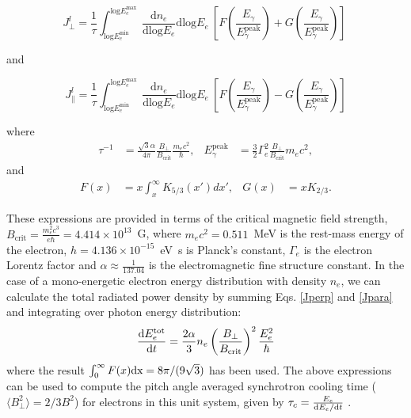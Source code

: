 \documentclass[usenatbib]{mnras}
\begin{document}
\begin{equation}
 {J_{\perp}^l} = \frac{1}{\tau}  \int_{\mathrm{log}E_e^{\mathrm{min}}}^{\mathrm{log}E_e^{\mathrm{max}}} \  \frac{\mathrm{d}n_e}{\mathrm{dlog}E_{e}} \mathrm{dlog}E_{e}\  \left[F\left(\frac{E_{\gamma}}{E_{\gamma}^{\mathrm{peak}}}\right) + G\left(\frac{E_{\gamma}}{E_{\gamma}^{\mathrm{peak}}}\right)\right] \
 \label{Jperp}
\end{equation}

\noindent and

\begin{equation}
{J_{\parallel}^l} = \frac{1}{\tau} \int_{\mathrm{log}E_e^{\mathrm{min}}}^{\mathrm{log}E_e^{\mathrm{max}}} \ \frac{\mathrm{d}n_e}{\mathrm{dlog}E_{e}} \mathrm{dlog}E_{e}\  \left[F\left(\frac{E_{\gamma}}{E_{\gamma}^{\mathrm{peak}}}\right) - G\left(\frac{E_{\gamma}}{E_{\gamma}^{\mathrm{peak}}}\right)\right] 
\label{Jpara}
\end{equation}

\noindent where
\begin{align}
\tau^{-1} &= \frac{\sqrt{3} \alpha}{4\pi}\frac{B_{\perp}}{B_{\mathrm{crit}}}\frac{m_{e}c^{2}}{\hbar},
 & 
E_{\gamma}^{\mathrm{peak}} &= \frac{3}{2}\Gamma_{e}^2 \frac{B_{\perp}}{B_{\mathrm{crit}}} m_{e} c^2,
\nonumber
\end{align}
and
\begin{align}
F(x) &= x \int_x^\infty K_{5/3}(x') dx', &
G(x) &= x K_{2/3}.
\nonumber
\end{align}

These expressions are provided in terms of the critical magnetic field strength, $B_{\mathrm{crit}} = \frac{m_e^2c^3}{e\hbar} = 4.414 \times 10^{13}$~G, where $m_e c^{2} = 0.511$~MeV is the rest-mass energy of the electron, $h = 4.136 \times 10^{-15}$~eV~s is Planck's constant, $\Gamma_{e}$ is the electron Lorentz factor and $\alpha \approx \frac{1}{137.04}$ is the electromagnetic fine structure constant. 
In the case of a mono-energetic electron energy distribution with density $n_{e}$, we can calculate the total radiated power density by summing Eqs. \ref{Jperp} and \ref{Jpara} and integrating over photon energy distribution:
\begin{equation}
\frac{{\rm d}E_e^{\rm tot}}{{\rm d}t} = \frac{2\alpha}{3} n_{e}\left(\frac{B_{\perp}}{B_{\rm crit}}\right)^{2}\frac{E_{e}^{2}}{\hbar}%
\label{Itot_l}
\end{equation}
where the result $\int_0^{\infty} F(x) \rm{d}x = 8\pi/(9\sqrt{3})$ \citep{1959ApJ...130..241W} has been used. The above expressions can be used to compute the pitch angle averaged synchrotron cooling time  ($\langle B_{\perp}^{2}\rangle = 2/3 B^{2}$) for electrons in this unit system, given by $\tau_c = \frac{E_e}{{\rm d}E_e/{\rm d}t}$ \citep{Taylor_Matthews}.
\end{document}
